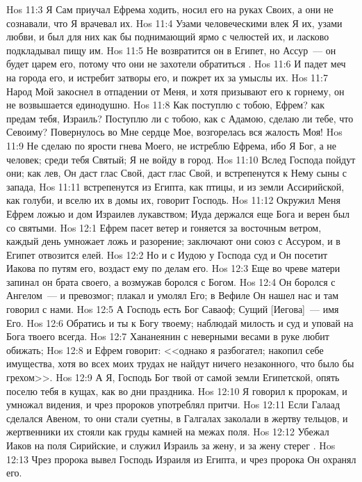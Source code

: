 \vs Hos 11:3 Я Сам приучал Ефрема ходить, носил его на руках Своих, а они не сознавали, что Я врачевал их.
\vs Hos 11:4 Узами человеческими влек Я их, узами любви, и был для них как бы поднимающий ярмо с челюстей их, и ласково подкладывал пищу им.
\vs Hos 11:5 Не возвратится он в Египет, но Ассур~--- он будет царем его, потому что они не захотели обратиться .
\vs Hos 11:6 И падет меч на города его, и истребит затворы его, и пожрет их за умыслы их.
\vs Hos 11:7 Народ Мой закоснел в отпадении от Меня, и хотя призывают его к горнему, он не возвышается единодушно.
\vs Hos 11:8 Как поступлю с тобою, Ефрем? как предам тебя, Израиль? Поступлю ли с тобою, как с Адамою, сделаю ли тебе, что Севоиму? Повернулось во Мне сердце Мое, возгорелась вся жалость Моя!
\vs Hos 11:9 Не сделаю по ярости гнева Моего, не истреблю Ефрема, ибо Я Бог, а не человек; среди тебя Святый; Я не войду в город.
\vs Hos 11:10 Вслед Господа пойдут они; как лев, Он даст глас Свой, даст глас Свой, и встрепенутся к Нему сыны с запада,
\vs Hos 11:11 встрепенутся из Египта, как птицы, и из земли Ассирийской, как голуби, и вселю их в домы их, говорит Господь.
\vs Hos 11:12 Окружил Меня Ефрем ложью и дом Израилев лукавством; Иуда держался еще Бога и верен был со святыми.
\vs Hos 12:1 Ефрем пасет ветер и гоняется за восточным ветром, каждый день умножает ложь и разорение; заключают они союз с Ассуром, и в Египет отвозится елей.
\vs Hos 12:2 Но и с Иудою у Господа суд и Он посетит Иакова по путям его, воздаст ему по делам его.
\vs Hos 12:3 Еще во чреве матери запинал он брата своего, а возмужав боролся с Богом.
\vs Hos 12:4 Он боролся с Ангелом~--- и превозмог; плакал и умолял Его; в Вефиле Он нашел нас и там говорил с нами.
\vs Hos 12:5 А Господь есть Бог Саваоф; Сущий [Иегова]~--- имя Его.
\vs Hos 12:6 Обратись и ты к Богу твоему; наблюдай милость и суд и уповай на Бога твоего всегда.
\vs Hos 12:7 Хананеянин с неверными весами в руке любит обижать;
\vs Hos 12:8 и Ефрем говорит: <<однако я разбогател; накопил себе имущества, хотя во всех моих трудах не найдут ничего незаконного, что было бы грехом>>.
\vs Hos 12:9 А Я, Господь Бог твой от самой земли Египетской, опять поселю тебя в кущах, как во дни праздника.
\vs Hos 12:10 Я говорил к пророкам, и умножал видения, и чрез пророков употреблял притчи.
\vs Hos 12:11 Если Галаад сделался Авеном, то они стали суетны, в Галгалах заколали в жертву тельцов, и жертвенники их стояли как груды камней на межах поля.
\vs Hos 12:12 Убежал Иаков на поля Сирийские, и служил Израиль за жену, и за жену стерег .
\vs Hos 12:13 Чрез пророка вывел Господь Израиля из Египта, и чрез пророка Он охранял его.
